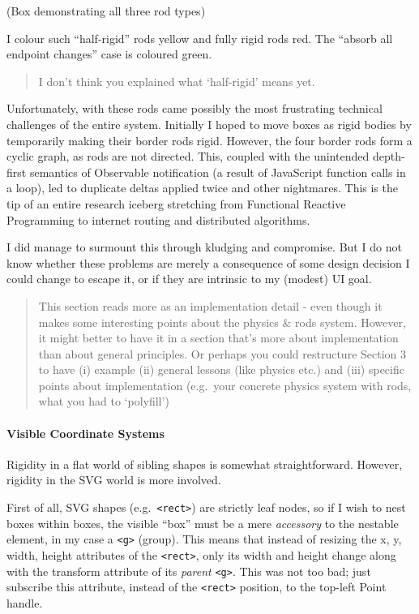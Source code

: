 \documentclass[english,submission]{programming}
\begin{document}
(Box demonstrating all three rod types)

I colour such ``half-rigid'' rods yellow and fully rigid rods red. The
``absorb all endpoint changes'' case is coloured green.

\begin{quote}
I don't think you explained what `half-rigid' means yet.
\end{quote}

Unfortunately, with these rods came possibly the most frustrating
technical challenges of the entire system. Initially I hoped to move
boxes as rigid bodies by temporarily making their border rods rigid.
However, the four border rods form a cyclic graph, as rods are not
directed. This, coupled with the unintended depth-first semantics of
Observable notification (a result of JavaScript function calls in a
loop), led to duplicate deltas applied twice and other nightmares. This
is the tip of an entire research iceberg stretching from Functional
Reactive Programming to internet routing and distributed algorithms.

I did manage to surmount this through kludging and compromise. But I do
not know whether these problems are merely a consequence of some design
decision I could change to escape it, or if they are intrinsic to my
(modest) UI goal.

\begin{quote}
This section reads more as an implementation detail - even though it
makes some interesting points about the physics \& rods system. However,
it might better to have it in a section that's more about implementation
than about general principles. Or perhaps you could restructure Section
3 to have (i) example (ii) general lessons (like physics etc.) and (iii)
specific points about implementation (e.g.~your concrete physics system
with rods, what you had to `polyfill')
\end{quote}

\hypertarget{visible-coordinate-systems}{%
\paragraph{Visible Coordinate
Systems}\label{visible-coordinate-systems}}

Rigidity in a flat world of sibling shapes is somewhat straightforward.
However, rigidity in the SVG world is more involved.

First of all, SVG shapes (e.g.~\texttt{\textless{}rect\textgreater{}})
are strictly leaf nodes, so if I wish to nest boxes within boxes, the
visible ``box'' must be a mere \emph{accessory} to the nestable element,
in my case a \texttt{\textless{}g\textgreater{}} (group). This means
that instead of resizing the x, y, width, height attributes of the
\texttt{\textless{}rect\textgreater{}}, only its width and height change
along with the transform attribute of its \emph{parent}
\texttt{\textless{}g\textgreater{}}. This was not too bad; just
subscribe this attribute, instead of the
\texttt{\textless{}rect\textgreater{}} position, to the top-left Point
handle.
\end{document}
